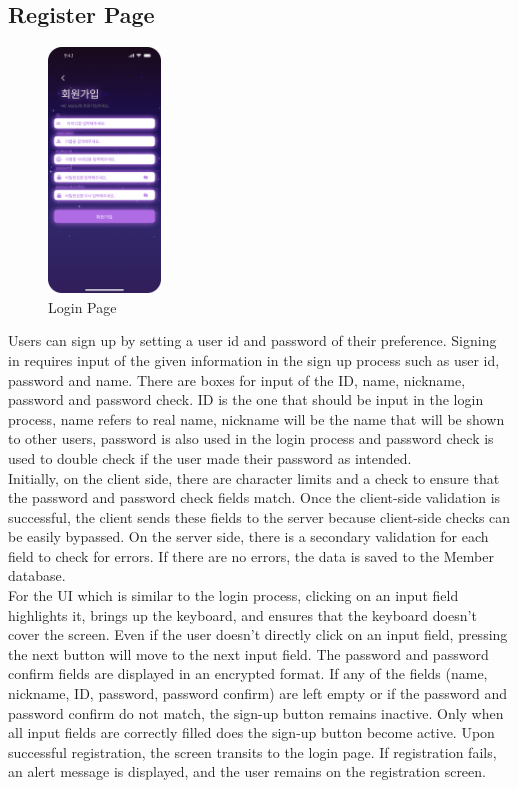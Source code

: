 \documentclass[conference]{IEEEtran}
\begin{document}
    \subsection{Register Page}
        \begin{figure}[htbp]
        \centerline{\includegraphics[width=3cm]{Images/screen/2_Register.png}}
        \caption{Login Page}
        \label{fig}
        \end{figure}
        Users can sign up by setting a user id and password of their preference. Signing in requires input  of the given information in the sign up process such as user id, password and name. There are boxes for input of the ID, name, nickname, password and password check. ID is the one that should be input in the login process, name refers to real name, nickname will be the name that will be shown to other users, password is also used in the login process and password check is used to double check if the user made their password as intended.\\
        Initially, on the client side, there are character limits and a check to ensure that the password and password check fields match. Once the client-side validation is successful, the client sends these fields to the server because client-side checks can be easily bypassed. On the server side, there is a secondary validation for each field to check for errors. If there are no errors, the data is saved to the Member database.  \\
        For the UI which is similar to the login process, clicking on an input field highlights it, brings up the keyboard, and ensures that the keyboard doesn't cover the screen. Even if the user doesn't directly click on an input field, pressing the next button will move to the next input field. The password and password confirm fields are displayed in an encrypted format. If any of the fields (name, nickname, ID, password, password confirm) are left empty or if the password and password confirm do not match, the sign-up button remains inactive. Only when all input fields are correctly filled does the sign-up button become active. Upon successful registration, the screen transits to the login page. If registration fails, an alert message is displayed, and the user remains on the registration screen.
\end{document}
